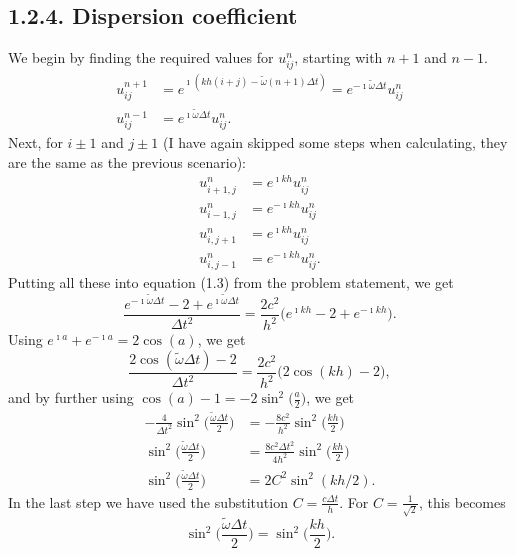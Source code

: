 \documentclass[12pt]{scrartcl}
\begin{document}
\subsection*{1.2.4. Dispersion coefficient}
We begin by finding the required values for $u_{ij}^n$, starting with $n+1$ and $n-1$.
\begin{align*}
    u_{ij}^{n+1}&= e^{\imath(kh(i+j)-\tilde{\omega}(n+1)\Delta t)} = e^{-\imath\tilde{\omega}\Delta t}u_{ij}^n\\
    u_{ij}^{n-1}&= e^{\imath\tilde{\omega}\Delta t}u_{ij}^n.
\end{align*}
Next, for $i\pm1$ and $j\pm 1$ (I have again skipped some steps when calculating, they are the same as the previous scenario):
\begin{align*}
    u_{i+1,j}^n&= e^{\imath kh}u_{ij}^n\\
    u_{i-1,j}^n&= e^{-\imath kh}u_{ij}^n\\
    u_{i,j+1}^n&= e^{\imath kh}u_{ij}^n\\
    u_{i,j-1}^n&= e^{-\imath kh}u_{ij}^n.
\end{align*}
Putting all these into equation (1.3) from the problem statement, we get
\begin{equation}
    \frac{e^{-\imath\tilde{\omega}\Delta t}-2+e^{\imath\tilde{\omega}\Delta t}}{\Delta t^2} = \frac{2c^2}{h^2}\bigl(e^{\imath kh}-2+e^{-\imath kh}\bigr).
\end{equation}
Using $e^{\imath a}+e^{-\imath a}=2\cos(a)$, we get
\begin{equation*}
    \frac{2\cos(\tilde{\omega}\Delta t)-2}{\Delta t^2} = \frac{2c^2}{h^2}\bigl( 2\cos(kh)-2 \bigr),
\end{equation*}
and by further using $\cos(a)-1=-2\sin^2\bigl(\frac{a}{2}\bigr)$, we get
\begin{align*}
    -\frac{4}{\Delta t^2}\sin^2\biggl(\frac{\tilde{\omega}\Delta t}{2}\biggr)&= -\frac{8c^2}{h^2}\sin^2\biggl(\frac{kh}{2}\biggr)\\
    \sin^2\biggl(\frac{\tilde{\omega}\Delta t}{2}\biggr)&= \frac{8c^2\Delta t^2}{4h^2}\sin^2\biggl(\frac{kh}{2}\biggr)\\
    \sin^2\biggl(\frac{\tilde{\omega}\Delta t}{2}\biggr)&=2C^2\sin^2(kh/2).
\end{align*}
In the last step we have used the substitution $C=\frac{c\Delta t}{h}$. For $C=\frac{1}{\sqrt{2}}$, this becomes
\begin{equation}
    \sin^2\biggl(\frac{\tilde{\omega}\Delta t}{2}\biggr) = \sin^2\biggl(\frac{kh}{2}\biggr).
\end{equation}
\end{document}
